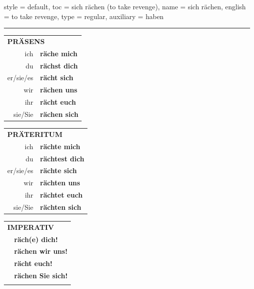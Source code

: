 \begin{verbentry}{
  style = {default},
  toc = {sich rächen (to take revenge)},
  name = {sich rächen},
  english = {to take revenge},
  type = {regular},
  auxiliary = {haben}
}
 
    
     \vspace{5pt}

    \hrule
    
    \vspace{5pt}

  \begin{tabular}{rl}
     \multicolumn{2}{l}{\textbf{PRÄSENS} }\\
    ich & \textbf{räche mich}\\
    du & \textbf{rächst dich}\\
    er/sie/es & \textbf{rächt sich}\\
    wir & \textbf{rächen uns}\\
    ihr & \textbf{rächt euch}\\
    sie/Sie & \textbf{rächen sich}\\
  \end{tabular}
  \hfill
     \begin{tabular}{rl}
    \multicolumn{2}{l}{\textbf{PRÄTERITUM} }\\
    ich & \textbf{rächte mich}\\
    du & \textbf{rächtest dich}\\
    er/sie/es & \textbf{rächte sich}\\
    wir & \textbf{rächten uns}\\
    ihr & \textbf{rächtet euch}\\
    sie/Sie & \textbf{rächten sich}\\
  \end{tabular}
  \hfill
  \begin{tabular}{rl}
     \multicolumn{2}{l}{\textbf{IMPERATIV} }\\
   & \textbf{räch(e) dich!}\\
   & \textbf{rächen wir uns!}\\
   & \textbf{rächt euch!}\\
   & \textbf{rächen Sie sich!}\\
   & \vspace{10pt}
  \end{tabular}

    \vspace{10pt}


\end{verbentry}
